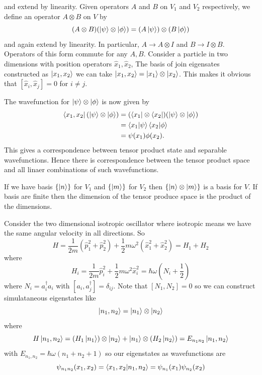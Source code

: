 \documentclass{article}
\begin{document}
and extend by linearity. Given operators $ A $ and $ B $ on $ V_1 $ and $ V_2 $ respectively, we define an operator $ A\otimes B $ on $ V $ by
\[
	(A\otimes B)(\ket \psi \otimes \ket\phi) = (A\ket \psi)\otimes (B\ket\phi)
\]
and again extend by linearity. In particular, $ A\longrightarrow A\otimes I $ and $ B\longrightarrow I \otimes B $. Operators of this form commute for any $ A,B $. Consider a particle in two dimensions with position operators $ \hat x_1, \hat x_2 $, The basis of join eigensates constructed as $ \ket{x_1,x_2} $ we can take $ \ket{x_1,x_2}=\ket{x_1}\otimes \ket{x_2} $. This makes it obvious that $ [\hat x_i,\hat x_j] = 0 $ for $ i\ne j $.\par
The wavefunction for $ \ket \psi \otimes \ket \phi $ is now given by
\begin{align*}
	\bra{x_1,x_2}(\ket \psi \otimes \ket\phi) &= (\bra {x_1}\otimes \bra{x_2})(\ket\psi\otimes \ket \phi) \\
						  &= \bra{x_1}\ket {\psi}\bra{x_2}\ket{\phi} \\
						  &= \psi(x_1)\phi(x_2).
\end{align*}
This gives a correspondence between tensor product state and separable wavefunctions. Hence there is  correspondence between the tensor product space and all linaer combinations of such wavefunctions.
\begin{remark}
	If we have basis $ \{\ket n\} $ for $ V_1 $ and $ \{\ket m\} $ for $ V_2 $ then $ \{\ket n\otimes \ket {m}\} $ is a basis for $ V $. If basis are finite then the dimension of the tensor produce space is the product of the dimensions.
\end{remark}
\begin{example}
  Consider the two dimensional isotropic oscillator where isotropic means we have the same angular velocity in all directions. So
  \[
	  H = \frac 1{2m}(\hat p_1^2 + \hat p_2^2) + \frac 12 m\omega^2 (\hat x_1^2 + \hat x_2^2) = H_1 + H_2
  \]
  where
  \[
	  H_i = \frac 1{2m}\hat p_i^2 + \frac 12 m\omega^2 \hat x_i^2 = \hbar \omega\left(N_i+\frac 12\right)
  \]
  where $ N_i = a_i^\dagger a_i $ with $ [a_i,a_j^\dagger] = \delta_{ij} $. Note that $ [N_1,N_2]=0 $ so we can construct simulataneous eigenstates like
  \[
	  \ket{n_1,n_2} = \ket{n_1}\otimes \ket{n_2}
  \]
  where
  \[
	  H\ket{n_1,n_2} = (H_1\ket{n_1})\otimes \ket{n_2} + \ket{n_1}\otimes (H_2\ket{n_2}) = E_{n_1n_2}\ket{n_1,n_2}
  \]
  with $ E_{n_1,n_2} = \hbar\omega(n_1+n_2+1) $ so our eigenstates as wavefunctions are
  \[
  \psi_{n_1n_2}(x_1,x_2) = \bra{x_1,x_2}\ket{n_1,n_2} = \psi_{n_1}(x_1)\psi_{n_2}(x_2)  \]
\end{example}
\end{document}

